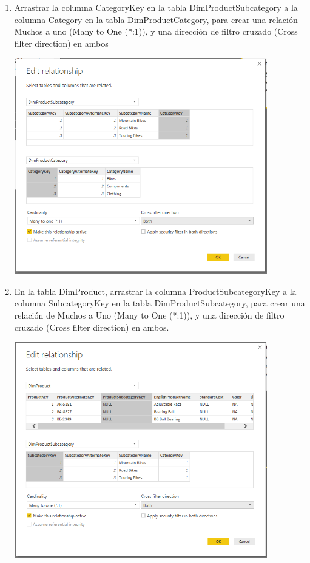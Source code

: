\begin{enumerate}[1.]
	\item Arrastrar la columna CategoryKey en la tabla DimProductSubcategory a la columna Category en la tabla
DimProductCategory, para crear una relación Muchos a uno (Many to One (*:1)), y una dirección de filtro
cruzado (Cross filter direction) en ambos

	
	\begin{center}
	\includegraphics[width=11cm]{./Imagenes/23} 
	\end{center}


	\item En la tabla DimProduct, arrastrar la columna ProductSubcategoryKey a la columna SubcategoryKey en la tabla DimProductSubcategory, para crear una relación de Muchos a Uno (Many to One (*:1)), y una dirección de filtro cruzado (Cross filter direction) en ambos.
	
	\begin{center}
	\includegraphics[width=11cm]{./Imagenes/24} 
	\end{center}


\end{enumerate}
